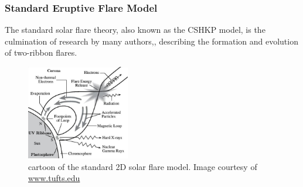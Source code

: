 \subsubsection{Standard Eruptive Flare Model}
The standard solar flare theory, also known as the CSHKP model, is the culmination of research by many authors,\citep{1964NASSP..50..451C, 1966Natur.211..695S, 1974SoPh...34..323H, 1976SoPh...50...85K}, describing the formation and evolution of two-ribbon flares. 

\begin{figure}[H]
  \begin{center}
  \includegraphics[width=0.40\textwidth]{flare}
  \caption{cartoon of the standard 2D solar flare model. Image courtesy of \href{http://ase.tufts.edu/cosmos/print_images.asp?id=47}{www.tufts.edu}}\label{flare-cartoon}
\end{center}
\end{figure}
 

